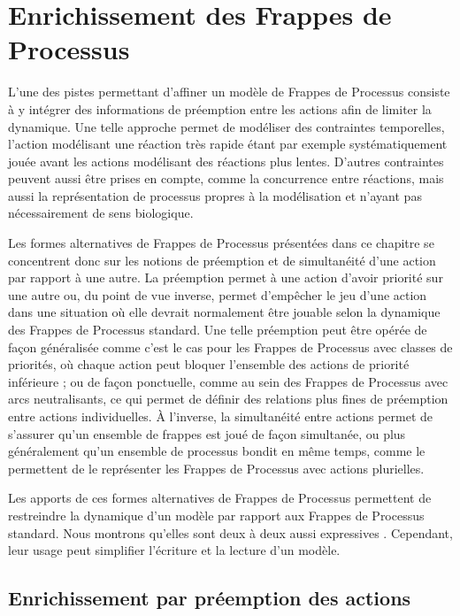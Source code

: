 
\chapter{Enrichissement des Frappes de Processus}

L'une des pistes permettant d'affiner un modèle de Frappes de Processus consiste à y intégrer
des informations de préemption entre les actions afin de limiter la dynamique.
Une telle approche permet de modéliser des contraintes temporelles,
l'action modélisant une réaction très rapide étant par exemple systématiquement jouée
avant les actions modélisant des réactions plus lentes.
D'autres contraintes peuvent aussi être prises en compte, comme la concurrence entre réactions,
mais aussi la représentation de processus propres à la modélisation et n'ayant pas nécessairement
de sens biologique.

Les formes alternatives de Frappes de Processus présentées dans ce chapitre se concentrent donc
sur les notions de préemption et de simultanéité d'une action par rapport à une autre.
La préemption permet à une action d'avoir priorité sur une autre ou, du point de vue inverse,
permet d'empêcher le jeu d'une action dans une situation où elle devrait normalement être jouable
selon la dynamique des Frappes de Processus standard.
Une telle préemption peut être opérée de façon généralisée
comme c'est le cas pour les Frappes de Processus avec classes de priorités,
où chaque action peut bloquer l'ensemble des actions de priorité inférieure ;
ou de façon ponctuelle, comme au sein des Frappes de Processus avec arcs neutralisants,
ce qui permet de définir des relations plus fines de préemption entre actions individuelles.
À l'inverse, la simultanéité entre actions permet de s'assurer qu'un ensemble de frappes est joué
de façon simultanée, ou plus généralement qu'un ensemble de processus bondit en même temps,
comme le permettent de le représenter les Frappes de Processus avec actions plurielles.

Les apports de ces formes alternatives de Frappes de Processus permettent de restreindre la dynamique
d'un modèle par rapport aux Frappes de Processus standard.
Nous montrons qu'elles sont deux à deux aussi expressives .
Cependant, leur usage peut simplifier l'écriture et la lecture d'un modèle.



\section{Enrichissement par préemption des actions}






